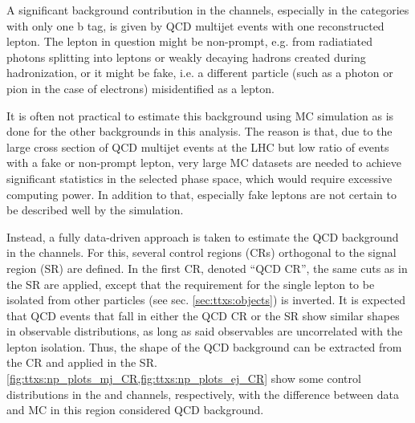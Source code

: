 A significant background contribution in the \ljets channels, especially in the categories with only one b tag, is given by QCD multijet events with one reconstructed lepton. The lepton in question might be non-prompt, e.g. from radiatiated photons splitting into leptons or weakly decaying hadrons created during hadronization, or it might be fake, i.e. a different particle (such as a photon or pion in the case of electrons) misidentified as a lepton.

It is often not practical to estimate this background using MC simulation as is done for the other backgrounds in this analysis. The reason is that, due to the large cross section of QCD multijet events at the LHC but low ratio of events with a fake or non-prompt lepton, very large MC datasets are needed to achieve significant statistics in the selected phase space, which would require excessive computing power. In addition to that, especially fake leptons are not certain to be described well by the simulation.

Instead, a fully data-driven approach is taken to estimate the QCD background in the \ljets channels. For this, several control regions (CRs) orthogonal to the signal region (SR) are defined. In the first CR, denoted ``QCD CR'', the same cuts as in the SR are applied, except that the requirement for the single lepton to be isolated from other particles (see sec. \ref{sec:ttxs:objects}) is inverted. It is expected that QCD events that fall in either the QCD CR or the SR show similar shapes in observable distributions, as long as said observables are uncorrelated with the lepton isolation. Thus, the shape of the QCD background can be extracted from the CR and applied in the SR. \cref{fig:ttxs:np_plots_mj_CR,fig:ttxs:np_plots_ej_CR} show some control distributions in the \mujets and \ejets channels, respectively, with the difference between data and MC in this region considered QCD background.

